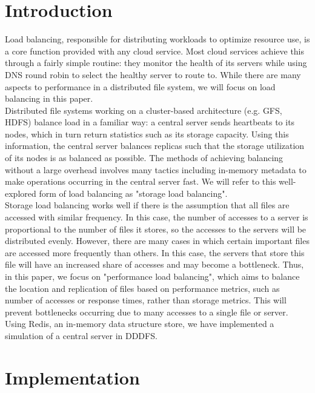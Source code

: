 \documentclass[twoside]{article}
\begin{document}
\begin{multicols}{2} %

\section{Introduction}

Load balancing, responsible for distributing workloads to optimize resource use, is a core function provided with any cloud service. Most cloud services achieve this through a fairly simple routine: they monitor the health of its servers while using DNS round robin to select the healthy server to route to. While there are many aspects to performance in a distributed file system, we will focus on load balancing in this paper.\\\indent
Distributed file systems working on a cluster-based architecture (e.g. GFS, HDFS) balance load in a familiar way: a central server sends heartbeats to its nodes, which in turn return statistics such as its storage capacity.  Using this information, the central server balances replicas such that the storage utilization of its nodes is as balanced as possible. The methods of achieving balancing without a large overhead involves many tactics including in-memory metadata to make operations occurring in the central server fast. We will refer to this well-explored form of load balancing as "storage load balancing".\\\indent
Storage load balancing works well if there is the assumption that all files are accessed with similar frequency. In this case, the number of accesses to a server is proportional to the number of files it stores, so the accesses to the servers will be distributed evenly. However, there are many cases in which certain important files are accessed more frequently than others. In this case, the servers that store this file will have an increased share of accesses and may become a bottleneck. Thus, in this paper, we focus on "performance load balancing", which aims to balance the location and replication of files based on performance metrics, such as number of accesses or response times, rather than storage metrics. This will prevent bottlenecks occurring due to many accesses to a single file or server. Using Redis, an in-memory data structure store, we have implemented a simulation of a central server in DDDFS.


\section{Implementation}

\end{multicols}
\end{document}

